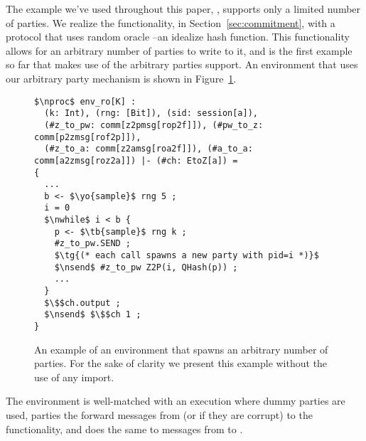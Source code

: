 
The example we've used throughout this paper, \Fcom, supports only a limited number of parties.
We realize the functionality, in Section~\ref{sec:commitment}, with a protocol that uses random oracle \Fro--an idealize hash function.
This functionality allows for an arbitrary number of parties to write to it, and is the first example so far that makes use of the arbitrary parties support.
An environment that uses our arbitrary party mechanism is shown in Figure~\ref{fig:envarb}.

\begin{figure}
	\centering
	\begin{lstlisting}[basicstyle=\footnotesize\BeraMonottFamily, mathescape, frame=single]
$\nproc$ env_ro[K] :
  (k: Int), (rng: [Bit]), (sid: session[a]),
  (#z_to_pw: comm[z2pmsg[rop2f]]), (#pw_to_z: comm[p2zmsg[rof2p]]),
  (#z_to_a: comm[z2amsg[roa2f]]), (#a_to_a: comm[a2zmsg[roz2a]]) |- (#ch: EtoZ[a]) =
{
  ...
  b <- $\yo{sample}$ rng 5 ;
  i = 0 
  $\nwhile$ i < b {
    p <- $\tb{sample}$ rng k ;
    #z_to_pw.SEND ;
    $\tg{(* each call spawns a new party with pid=i *)}$
    $\nsend$ #z_to_pw Z2P(i, QHash(p)) ;
    ...
  }
  $\$$ch.output ;
  $\nsend$ $\$$ch 1 ;
}
	\end{lstlisting}
	\caption{An example of an environment that spawns an arbitrary number of parties. For the sake of clarity we present this example without the use of any import.}
	\label{fig:envarb}
\end{figure}

The environment is well-matched with an execution where dummy parties are used, parties the forward messages from \Z (or \A if they are corrupt) to the functionality, and does the same to messages from \F to \Z.
    	
